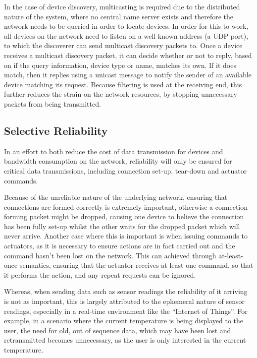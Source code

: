 In the case of device discovery, multicasting is required due to the distributed nature of the system, where no central name server exists and therefore the network needs to be queried in order to locate devices. In order for this to work, all devices on the network need to listen on a well known address (a UDP port), to which the discoverer can send multicast discovery packets to.
Once a device receives a multicast discovery packet, it can decide whether or not to reply, based on if the query information, device type or name, matches its own. If it does match, then it replies using a unicast message to notify the sender of an available device matching its request. Because filtering is used at the receiving end, this further reduces the strain on the network resources, by stopping unnecessary packets from being transmitted.   
\subsection{Selective Reliability} %
\label{sub:selective_reliability}
In an effort to both reduce the cost of data transmission for devices and bandwidth consumption on the network, reliability will only be ensured for critical data transmissions, including connection set-up, tear-down and actuator commands.

Because of the unreliable nature of the underlying network, ensuring that connections are formed correctly is extremely important, otherwise a connection forming packet might be dropped, causing one device to believe the connection has been fully set-up whilst the other waits for the dropped packet which will never arrive. 
Another case where this is important is when issuing commands to actuators, as it is necessary to ensure actions are in fact carried out and the command hasn't been lost on the network. This can achieved through at-least-once semantics, ensuring that the actuator receives at least one command, so that it performs the action, and any repeat requests can be ignored.

Whereas, when sending data such as sensor readings the reliability of it arriving is not as important, this is largely attributed to the ephemeral nature of sensor readings, especially in a real-time environment like the ``Internet of Things''. For example, in a scenario where the current temperature is being displayed to the user, the need for old, out of sequence data, which may have been lost and retransmitted becomes unnecessary, as the user is only interested in the current temperature.


